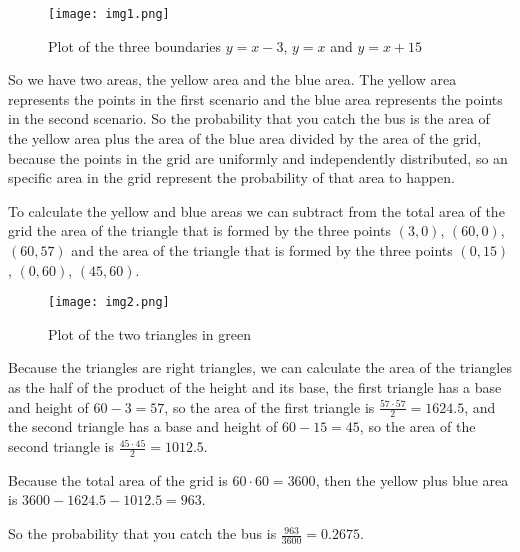 \singlespacing

\break

\begin{figure}[h]
    \centering
    \texttt{[image: img1.png]}
    \caption{Plot of the three boundaries $y = x - 3$, $y = x$ and $y = x + 15$}
\end{figure}

\singlespacing
\singlespacing

So we have two areas, the yellow area and the blue area. The yellow area
represents the points in the first scenario and the blue area represents
the points in the second scenario. So the probability that you catch the
bus is the area of the yellow area plus the area of the blue area divided
by the area of the grid, because the points in the grid are uniformly and
independently distributed, so an specific area in the grid represent the
probability of that area to happen.

\singlespacing
\singlespacing

To calculate the yellow and blue areas we can subtract from the total
area of the grid the area of the triangle that is formed by the three
points $(3, 0)$, $(60, 0)$, $(60, 57)$ and the area of the triangle
that is formed by the three points $(0, 15)$, $(0, 60)$, $(45, 60)$.

\singlespacing
\singlespacing

\begin{figure}[h]
    \centering
    \texttt{[image: img2.png]}
    \caption{Plot of the two triangles in green}
\end{figure}

\break

Because the triangles are right triangles, we can calculate the area
of the triangles as the half of the product of the height and
its base, the first
triangle has a base and height of $60 - 3 = 57$,
so the area of the first triangle is $\frac{57 \cdot 57}{2} = 1624.5$,
and the second triangle has a base and height of $60 - 15 = 45$,
so the area of the second triangle is $\frac{45 \cdot 45}{2} = 1012.5$.

\singlespacing
\singlespacing

Because the total area of the grid is $60 \cdot 60 = 3600$, then the
yellow plus blue area is $3600 - 1624.5 - 1012.5 = 963$.

\singlespacing
\singlespacing
\singlespacing

So the probability that you catch the bus is $\frac{963}{3600} = 0.2675$.